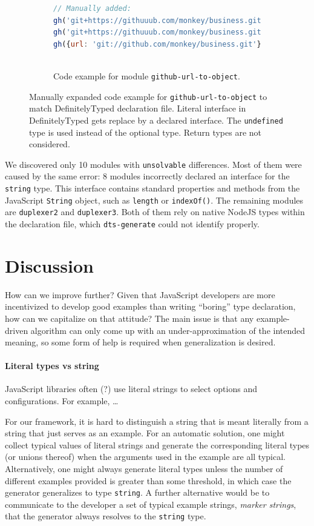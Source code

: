 \documentclass[english,cleveref,autoref,submission]{programming}
\begin{document}
\begin{figure}[tp]
\begin{subfigure}{0.80\linewidth}
\begin{lstlisting}[language=JavaScript]
// Manually added:
gh('git+https://githuuub.com/monkey/business.git', {});
gh('git+https://githuuub.com/monkey/business.git', {enterprise: true});
gh({url: 'git://github.com/monkey/business.git'});
      
    \end{lstlisting}
    \caption{Code example for module \texttt{github-url-to-object}.}
    \end{subfigure}
  \caption{Manually expanded code example for \texttt{github-url-to-object} to match DefinitelyTyped declaration file. Literal interface in DefinitelyTyped gets replace by a declared interface. The \texttt{undefined} type is used instead of the optional type. Return types are not considered.}
  \label{fig:experiments-results-manually-completed-examples}
\end{figure}

We discovered only 10 modules with \texttt{unsolvable} differences. Most of them were
caused by the same error: 8 modules incorrectly declared an interface for the
\texttt{string} type. This interface contains standard properties and methods from the
JavaScript \texttt{String} object, such as \texttt{length} or \texttt{indexOf()}. The
remaining modules are \texttt{duplexer2} and \texttt{duplexer3}. Both of them rely on native
NodeJS types within the declaration file, which \texttt{dts-generate} could not identify
properly.

\section{Discussion}
\label{sec:discussion}

How can we improve further? Given that JavaScript developers are more incentivized to develop good
examples than writing ``boring'' type declaration, how can we capitalize on that attitude?
The main issue is that any example-driven algorithm can only come up with an
under-approximation of the intended meaning, so some form of help is required when
generalization is desired.

\paragraph*{Literal types vs string}
JavaScript libraries often (?) use literal strings to select
options and configurations. For example, \dots

For our framework, it is hard to distinguish a string that is meant literally from a
string that just serves as an example. For an automatic solution, one might collect
typical values of literal strings and generate the corresponding literal types (or
unions thereof) when the arguments used in the example are all typical. Alternatively, one
might always generate literal types unless the number of different examples provided is
greater than some threshold, in which case the generator generalizes to type
\lstinline/string/. A further alternative would be to communicate to the developer a set
of typical example strings, \emph{marker strings}, that the generator always resolves to the \lstinline/string/
type.
\end{document}
